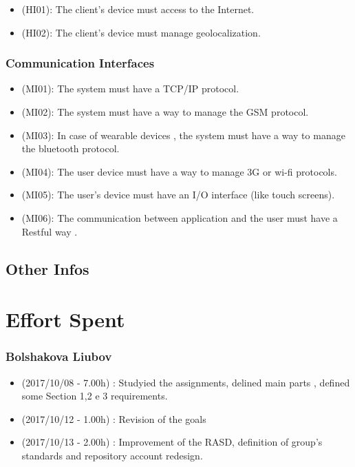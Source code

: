 \documentclass[a4paper]{book}
\begin{document}
\begin{itemize}
\item (HI01): The client's device must access to the Internet.
\item (HI02): The client's device must manage geolocalization. 
\end{itemize}

\section{Communication Interfaces}

\begin{itemize}
\item (MI01): The system must have a TCP/IP protocol.
\item (MI02): The system must have a way to manage the GSM protocol.
\item (MI03): In case of wearable devices , the system must have a way to manage the bluetooth protocol.
\item (MI04): The user device must have a way to manage 3G or wi-fi protocols.
\item (MI05): The user's device must have an I/O interface (like touch screens).
\item (MI06): The communication between application and the user must have a Restful way .
\end{itemize}

\chapter{Other Infos}

\part{Effort Spent}

\section{Bolshakova Liubov}
\begin{itemize}
\item (2017/10/08 - 7.00h) : Studyied the assignments, delined main parts , defined some Section 1,2 e 3 requirements.
\item (2017/10/12 - 1.00h) : Revision of the goals 
\item (2017/10/13 - 2.00h) : Improvement of the RASD, definition of group's standards and repository account redesign.
\end{itemize}
\end{document}
